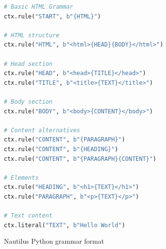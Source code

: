 \begin{figure}[H]
\centering
\begin{lstlisting}[language=Python,basicstyle=\scriptsize\ttfamily,frame=single]
# Basic HTML Grammar
ctx.rule("START", b"{HTML}")

# HTML structure
ctx.rule("HTML", b"<html>{HEAD}{BODY}</html>")

# Head section
ctx.rule("HEAD", b"<head>{TITLE}</head>")
ctx.rule("TITLE", b"<title>{TEXT}</title>")

# Body section
ctx.rule("BODY", b"<body>{CONTENT}</body>")

# Content alternatives
ctx.rule("CONTENT", b"{PARAGRAPH}")
ctx.rule("CONTENT", b"{HEADING}")
ctx.rule("CONTENT", b"{PARAGRAPH}{CONTENT}")

# Elements
ctx.rule("HEADING", b"<h1>{TEXT}</h1>")
ctx.rule("PARAGRAPH", b"<p>{TEXT}</p>")

# Text content
ctx.literal("TEXT", b"Hello World")
\end{lstlisting}
\caption{Nautilus Python grammar format}
\label{fig:grammar-format-python}
\end{figure}
